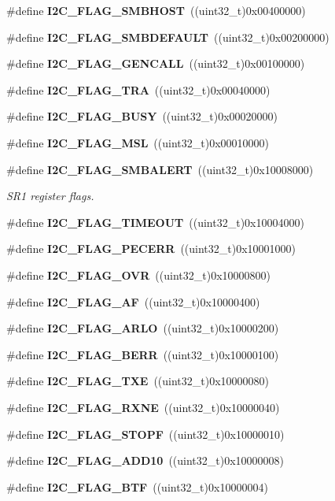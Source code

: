 \begin{DoxyCompactItemize}
\#define \textbf{ I2\+C\+\_\+\+F\+L\+A\+G\+\_\+\+S\+M\+B\+H\+O\+ST}~((uint32\+\_\+t)0x00400000)
\item 
\#define \textbf{ I2\+C\+\_\+\+F\+L\+A\+G\+\_\+\+S\+M\+B\+D\+E\+F\+A\+U\+LT}~((uint32\+\_\+t)0x00200000)
\item 
\#define \textbf{ I2\+C\+\_\+\+F\+L\+A\+G\+\_\+\+G\+E\+N\+C\+A\+LL}~((uint32\+\_\+t)0x00100000)
\item 
\#define \textbf{ I2\+C\+\_\+\+F\+L\+A\+G\+\_\+\+T\+RA}~((uint32\+\_\+t)0x00040000)
\item 
\#define \textbf{ I2\+C\+\_\+\+F\+L\+A\+G\+\_\+\+B\+U\+SY}~((uint32\+\_\+t)0x00020000)
\item 
\#define \textbf{ I2\+C\+\_\+\+F\+L\+A\+G\+\_\+\+M\+SL}~((uint32\+\_\+t)0x00010000)
\item 
\#define \textbf{ I2\+C\+\_\+\+F\+L\+A\+G\+\_\+\+S\+M\+B\+A\+L\+E\+RT}~((uint32\+\_\+t)0x10008000)
\begin{DoxyCompactList}\small\item\em S\+R1 register flags. \end{DoxyCompactList}\item 
\#define \textbf{ I2\+C\+\_\+\+F\+L\+A\+G\+\_\+\+T\+I\+M\+E\+O\+UT}~((uint32\+\_\+t)0x10004000)
\item 
\#define \textbf{ I2\+C\+\_\+\+F\+L\+A\+G\+\_\+\+P\+E\+C\+E\+RR}~((uint32\+\_\+t)0x10001000)
\item 
\#define \textbf{ I2\+C\+\_\+\+F\+L\+A\+G\+\_\+\+O\+VR}~((uint32\+\_\+t)0x10000800)
\item 
\#define \textbf{ I2\+C\+\_\+\+F\+L\+A\+G\+\_\+\+AF}~((uint32\+\_\+t)0x10000400)
\item 
\#define \textbf{ I2\+C\+\_\+\+F\+L\+A\+G\+\_\+\+A\+R\+LO}~((uint32\+\_\+t)0x10000200)
\item 
\#define \textbf{ I2\+C\+\_\+\+F\+L\+A\+G\+\_\+\+B\+E\+RR}~((uint32\+\_\+t)0x10000100)
\item 
\#define \textbf{ I2\+C\+\_\+\+F\+L\+A\+G\+\_\+\+T\+XE}~((uint32\+\_\+t)0x10000080)
\item 
\#define \textbf{ I2\+C\+\_\+\+F\+L\+A\+G\+\_\+\+R\+X\+NE}~((uint32\+\_\+t)0x10000040)
\item 
\#define \textbf{ I2\+C\+\_\+\+F\+L\+A\+G\+\_\+\+S\+T\+O\+PF}~((uint32\+\_\+t)0x10000010)
\item 
\#define \textbf{ I2\+C\+\_\+\+F\+L\+A\+G\+\_\+\+A\+D\+D10}~((uint32\+\_\+t)0x10000008)
\item 
\#define \textbf{ I2\+C\+\_\+\+F\+L\+A\+G\+\_\+\+B\+TF}~((uint32\+\_\+t)0x10000004)

\end{DoxyCompactItemize}
